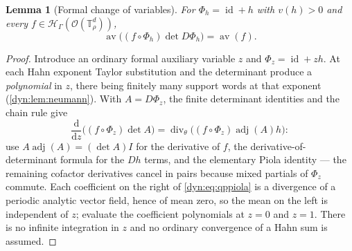 \documentclass[11pt,letterpaper]{article}
\newtheorem{lemma}[lemma]{Lemma}
\theoremstyle{definition}
\theoremstyle{remark}
\newcommand{\HH}{\mathscr H}
\newcommand{\OO}{\mathcal O}
\newcommand{\id}{\operatorname{id}}
\newcommand{\TT}{\mathbb T}
\newcommand{\strip}{\OO(\TT^{d}_{\rho})}
\newcommand{\av}{\operatorname{av}}
\newcommand{\diver}{\operatorname{div}}
\numberwithin{equation}{section}
\begin{document}
\begin{lemma}[Formal change of variables]\label{dyn:lem:qpchangevar}
For $\Phi_h=\id+h$ with $v(h)>0$ and every $f\in\HH_\Gamma(\strip)$,
\begin{equation}\label{dyn:eq:qpchangevar}
 \av\bigl((f\circ\Phi_h)\det D\Phi_h\bigr)=\av(f).
\end{equation}
\end{lemma}
\begin{proof}
Introduce an ordinary formal auxiliary variable $z$ and
$\Phi_z=\id+zh$. At each Hahn exponent Taylor substitution and the
determinant produce a \emph{polynomial} in $z$, there being finitely many
support words at that exponent (\cref{dyn:lem:neumann}). With $A=D\Phi_z$,
the finite determinant identities and the chain rule give
\begin{equation}\label{dyn:eq:qppiola}
 \frac{\mathrm d}{\mathrm dz}\bigl((f\circ\Phi_z)\det A\bigr)
 =\diver_\theta\bigl((f\circ\Phi_z)\operatorname{adj}(A)h\bigr):
\end{equation}
use $A\operatorname{adj}(A)=(\det A)I$ for the derivative of $f$, the
derivative-of-determinant formula for the $Dh$ terms, and the elementary
Piola identity --- the remaining cofactor derivatives cancel in pairs
because mixed partials of $\Phi_z$ commute. Each coefficient on the right
of \eqref{dyn:eq:qppiola} is a divergence of a periodic analytic vector
field, hence of mean zero, so the mean on the left is independent of $z$;
evaluate the coefficient polynomials at $z=0$ and $z=1$. There is no
infinite integration in $z$ and no ordinary convergence of a Hahn sum is
assumed.
\end{proof}
\end{document}
